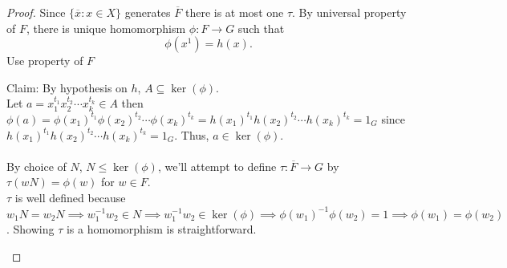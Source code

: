 \documentclass[a4paper,12pt]{article}
\begin{document}
\begin{proof}
    Since $ \{\overline{x}: x\in X\}$ generates $\overline{F}$ there is at most one $\tau$. By universal property of $F$, there is unique homomorphism $\phi:F\to G$ such that \[
    \phi(x^1)=h(x) \tag{For all $x\in X$}
    .\] 
    Use property of $F$
    \begin{center}
    \end{center}
    Claim: By hypothesis on $h$, $A\subseteq \ker(\phi)$.\\
    Let $a=x_1^{t_1}x_2^{t_2}\cdots x_k^{t_k}\in A$ then $\phi(a)=\phi(x_1)^{t_1}\phi(x_2)^{t_2}\cdots \phi(x_k)^{t_k}=h(x_1)^{t_1}h(x_2)^{t_2}\cdots h(x_k)^{t_k}=1_G$ since $h(x_1)^{t_1}h(x_2)^{t_2}\cdots h(x_k)^{t_k}=1_G$. Thus, $a\in \ker(\phi)$.\\\\
    By choice of $N$, $N\leq \ker(\phi)$, we'll attempt to define $\tau:\overline{F}\to G$ by $\tau(wN)=\phi(w)$ for $w\in F$. \\
    $\tau$ is well defined because $w_1N=w_2N\implies w_1^{-1}w_2\in N \implies w_1^{-1}w_2\in \ker(\phi)\implies \phi(w_1)^{-1}\phi(w_2)=1\implies \phi(w_1)=\phi(w_2)$. Showing $\tau$ is a homomorphism is straightforward.
    \begin{center}
    \end{center}
 \end{proof}
\newpage
\end{document}
